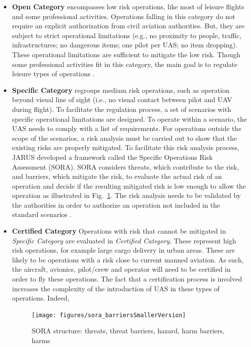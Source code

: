 \begin{itemize}
\item{\textbf{Open Category} encompasses low risk operations, like most of leisure flights and some professional activities. 
Operations falling in this category do not require an explicit authorization from civil aviation authorities. 
But, they are subject to strict operational limitations (e.g., no proximity to people, traffic, infrastructures; no dangerous items; one pilot per UAS; no item dropping). 
These operational limitations are sufficient to mitigate the low risk. 
Though some professional activities fit in this category, the main goal is to regulate leisure types of operations \cite{manfredi2018unmanned}.}
\item{\textbf{Specific Category} regroups medium risk operations, such as operation beyond visual line of sight (i.e., no visual contact between pilot and UAV during flight). 
To facilitate the regulation process, a set of scenarios with specific operational limitations are designed. 
To operate within a scenario, the UAS needs to comply with a list of requirements.
For operations outside the scope of the scenarios, a risk analysis must be carried out to show that the existing risks are properly mitigated. 
To facilitate this risk analysis process, JARUS developed a framework called the Specific Operations Risk Assessment (SORA). 
SORA considers threats, which contribute to the risk, and barriers, which mitigate the risk, to evaluate the actual risk of an operation and decide if the resulting mitigated risk is low enough to allow the operation as illustrated in Fig.~\ref{fig:sora_barriersSmallerVersion}.
The risk analysis needs to be validated by the authorities in order to authorize an operation not included in the standard scenarios \cite{manfredi2018unmanned}.}
\item{\textbf{Certified Category}  Operations with risk that cannot be mitigated in \emph{Specific Category} are evaluated in \emph{Certified Category}. 
These represent high risk operations, for example large cargo delivery in urban areas. 
These are likely to be operations with a risk close to current manned aviation. 
As such, the aircraft, avionics, pilot/crew and operator will need to be certified in order to fly these operations. 
The fact that a certification process is involved increases the complexity of the introduction of UAS in these types of operations. 
Indeed,  
\begin{landscape}
\begin{figure}
\begin{center}
\texttt{[image: figures/sora\_barriersSmallerVersion]}    %
\caption{SORA structure: threats, threat barriers, hazard, harm barriers, harms} 
\label{fig:sora_barriersSmallerVersion}
\end{center}
\end{figure}
\end{landscape}

}
\end{itemize}
